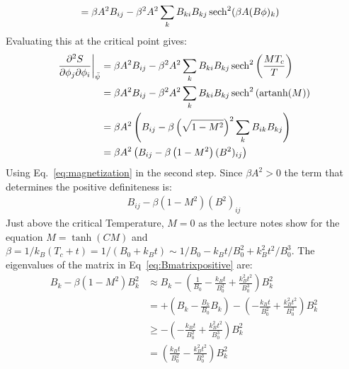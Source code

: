 \documentclass[12pt,a4]{article}
\DeclareMathOperator{\artanh}{artanh}
\begin{document}
\begin{enumerate}
\begin{enumerate}
\begin{align*}
                                            &= \beta A^2  B_{ij}  - \beta^2 A^2 \sum_k B_{ki} B_{kj}\sech^2(\beta A (B \phi)_k)
        \end{align*}
        Evaluating this at the critical point gives:
        \begin{align*}
          \left.\frac{\partial^2 S}{\partial \phi_j \partial \phi_i}\right|_{\bar{\psi}} 
                                            &= \beta A^2  B_{ij}  - \beta^2 A^2 \sum_k B_{ki} B_{kj}\sech^2\left(\frac{MT_c}{T}\right)\\
                                            &= \beta A^2  B_{ij}  - \beta^2 A^2 \sum_k B_{ki} B_{kj}\sech^2\left(\artanh(M)\right)\\
                                            &= \beta A^2  \left(B_{ij}  - \beta \left(\sqrt{1 - M^2}\right)^2 \sum_k B_{ik} B_{kj} \right)\\
                                            &= \beta A^2  \left(B_{ij}  - \beta \left(1 - M^2\right) (B^2)_{ij} \right)
        \end{align*}
        Using Eq.~\ref{eq:magnetization} in the second step. 
        Since $\beta A^2 > 0$ the term that determines the positive definiteness is:
        \begin{align}
          B_{ij}  - \beta \left(1 - M^2\right) (B^2)_{ij} \label{eq:Bmatrixpositive}
        \end{align}
        Just above the critical Temperature, $M = 0$ as the lecture notes show for the equation $M = \tanh(C M)$ and $\beta = 1 / k_B(T_c + t) = 1 / (B_0 + k_B t) \sim 1 / B_0 - k_B t / B_0^2 + k_B^2 t^2 / B_0^3$.
        The eigenvalues of the matrix in Eq~\ref{eq:Bmatrixpositive} are:
        \begin{align*}
          B_{k}  - \beta \left(1 - M^2\right) B^2_{k} & \approx B_{k}  - \left(\frac{1}{B_0} - \frac{k_B t}{B_0^2} + \frac{k_B^2 t^2}{B_0^3} \right)  B^2_{k} \nonumber\\
                                                      & = +(B_{k}  - \frac{B_k}{B_0}B_k) - \left( - \frac{k_B t}{B_0^2} + \frac{k_B^2 t^2}{B_0^3} \right)  B^2_{k} \nonumber\\
                                                      & \geq - \left( - \frac{k_B t}{B_0^2} + \frac{k_B^2 t^2}{B_0^3} \right)  B^2_{k} \nonumber\\
                                                      & = \left( \frac{k_B t}{B_0^2} - \frac{k_B^2 t^2}{B_0^3} \right)  B^2_{k} \nonumber\\

\end{align*}
\end{enumerate}
\end{enumerate}
\end{document}

